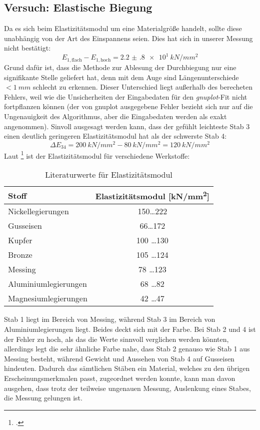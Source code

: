 \subsection{Versuch: Elastische Biegung}
Da es sich beim Elastizitätsmodul um eine Materialgröße handelt, sollte diese unabhängig von der Art des Einspannens seien. Dies hat sich in unserer Messung nicht bestätigt:
\begin{equation}
  E_{1,\text{flach}}-E_{1,\text{hoch}} = \SI{2.2(8)e1}{kN/mm^2}
  \label{eq:elastifalsch}
\end{equation}
Grund dafür ist, dass die Methode zur Ablesung der Durchbiegung nur eine signifikante Stelle geliefert hat, denn mit dem Auge sind Längenunterschiede $<\SI{1}{mm}$ schlecht zu erkennen. Dieser Unterschied liegt außerhalb des berecheten Fehlers, weil wie die Unsicherheiten der Eingabedaten für den \emph{gnuplot}-Fit nicht fortpflanzen können (der von gnuplot ausgegebene Fehler bezieht sich nur auf die Ungenauigkeit des Algorithmus, aber die Eingabedaten werden als exakt angenommen).
Sinvoll ausgesagt werden kann, dass der gefühlt leichteste Stab 3 einen deutlich geringeren Elastizitätsmodul hat als der schwerste Stab 4:
\begin{equation}
  \Delta E_{34}=\SI{200}{kN/mm^2} - \SI{80}{kN/mm^2}=\SI{120}{kN/mm^2}
  \label{eq:elastidiff34}
\end{equation}
Laut \footcite{ingenieurwissen} ist der Elastizitätsmodul für verschiedene Werkstoffe:

\begin{table}[H]
  \centering
  \begin{tabular}{l | c}
    Stoff & Elastizitätsmodul [\si{kN/mm^2}] \\ \hline
    Nickellegierungen & 150\ldots 222 \\
    Gusseisen & 66\ldots 172 \\
    Kupfer & 100 \ldots 130 \\
    Bronze & 105 \ldots 124 \\
    Messing & 78 \ldots 123 \\
    Aluminiumlegierungen & 68 \ldots 82 \\
    Magnesiumlegierungen & 42 \ldots 47
  \end{tabular}
  \caption{Literaturwerte für Elastizitätsmodul}
  \label{tab:litwertelasti}
\end{table}

Stab 1 liegt im Bereich von Messing, während Stab 3 im Bereich von Aluminiumlegierungen liegt. Beides deckt sich mit der Farbe. Bei Stab 2 und 4 ist der Fehler zu hoch, als das die Werte sinnvoll verglichen werden könnten, allerdings legt die sehr ähnliche Farbe nahe, dass Stab 2 genauso wie Stab 1 aus Messing besteht, während Gewicht und Aussehen von Stab 4 auf Gusseisen hindeuten.
Dadurch das sämtlichen Stäben ein Material, welches zu den übrigen Erscheinungsmerkmalen passt, zugeordnet werden konnte, kann man davon ausgehen, dass trotz der teilweise ungenauen Messung, Auslenkung eines Stabes, die Messung gelungen ist.
